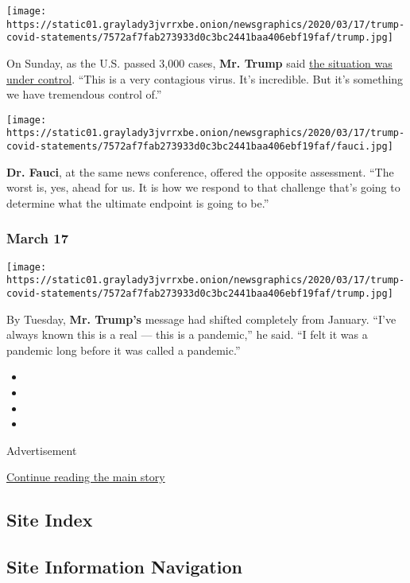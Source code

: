 \texttt{[image: https://static01.graylady3jvrrxbe.onion/newsgraphics/2020/03/17/trump-covid-statements/7572af7fab273933d0c3bc2441baa406ebf19faf/trump.jpg]}

On Sunday, as the U.S. passed 3,000 cases, \textbf{Mr. Trump} said
\href{https://www.whitehouse.gov/briefings-statements/remarks-president-trump-vice-president-pence-members-coronavirus-task-force-press-briefing-2/}{the
situation was under control}. ``This is a very contagious virus. It's
incredible. But it's something we have tremendous control of.''

\texttt{[image: https://static01.graylady3jvrrxbe.onion/newsgraphics/2020/03/17/trump-covid-statements/7572af7fab273933d0c3bc2441baa406ebf19faf/fauci.jpg]}

\textbf{Dr. Fauci}, at the same news conference, offered the opposite
assessment. ``The worst is, yes, ahead for us. It is how we respond to
that challenge that's going to determine what the ultimate endpoint is
going to be.''

\hypertarget{march-17}{%
\subsubsection{March 17}\label{march-17}}

\texttt{[image: https://static01.graylady3jvrrxbe.onion/newsgraphics/2020/03/17/trump-covid-statements/7572af7fab273933d0c3bc2441baa406ebf19faf/trump.jpg]}

By Tuesday, \textbf{Mr. Trump's} message had shifted completely from
January. ``I've always known this is a real --- this is a pandemic,'' he
said. ``I felt it was a pandemic long before it was called a pandemic.''

\begin{itemize}
\item
\item
\item
\item
\end{itemize}

Advertisement

\protect\hyperlink{after-bottom}{Continue reading the main story}

\hypertarget{site-index}{%
\subsection{Site Index}\label{site-index}}

\hypertarget{site-information-navigation}{%
\subsection{Site Information
Navigation}\label{site-information-navigation}}

